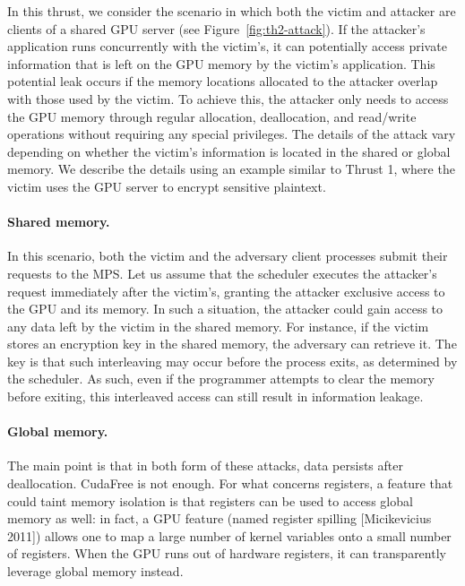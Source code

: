In this thrust, we consider the scenario in which both the victim and attacker are clients of a shared GPU server (see Figure~\ref{fig:th2-attack}). 
%
If the attacker's application runs concurrently with the victim's, it can potentially access private information that is left on the GPU memory by the victim's application.
%
This potential leak occurs if the memory locations allocated to the attacker overlap with those used by the victim.
%
To achieve this, the attacker only needs to access the GPU memory through regular allocation, deallocation, and read/write operations without requiring any special privileges.
%
The details of the attack vary depending on whether the victim's information is located in the shared or global memory.
%
We describe the details using an example similar to Thrust 1, where the victim uses the GPU server to encrypt sensitive plaintext.

\paragraph{Shared memory.}
%
In this scenario, both the victim and the adversary client processes submit their requests to the MPS. 
% 
Let us assume that the scheduler executes the attacker's request immediately after the victim's, granting the attacker exclusive access to the GPU and its memory.
% 
In such a situation, the attacker could gain access to any data left by the victim in the shared memory. 
% 
For instance, if the victim stores an encryption key in the shared memory, the adversary can retrieve it.
% 
The key is that such interleaving may occur before the process exits, as determined by the scheduler. 
% 
As such, even if the programmer attempts to clear the memory before exiting, this interleaved access can still result in information leakage. 




\paragraph{Global memory.}

% 
The main point is that in both form of these attacks, data persists after deallocation. CudaFree is not enough.
For what concerns registers, a feature that could taint memory isolation is that registers can be used to access global memory as well: in fact, a GPU feature (named register
spilling [Micikevicius 2011]) allows one to map a large number of kernel variables onto
a small number of registers. When the GPU runs out of hardware registers, it can
transparently leverage global memory instead.


